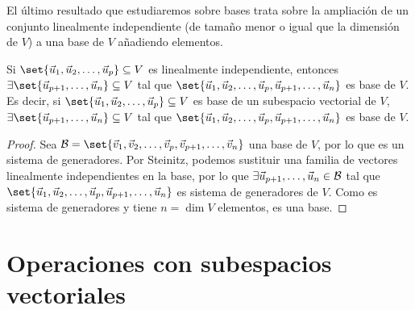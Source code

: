 \documentclass[../algebra_lineal.tex]{subfiles}
\begin{document}
El último resultado que estudiaremos sobre bases trata sobre la ampliación de un conjunto linealmente independiente (de tamaño menor o igual que la dimensión de $V$) a una base de $V$ añadiendo elementos.
\begin{theorem}   
    Si $\set{\vlst{u}{p}} \subseteq V$ es linealmente independiente, entonces  $\exists \set{\vu_{p+1}, \dots, \vu_n} \subseteq V$ tal que $\set{\vlst{u}{p}, \vu_{p+1}, \dots, \vu_n}$ es base de $V$. Es decir, si $\set{\vlst{u}{p}} \subseteq V$ es base de un subespacio vectorial de $V$, $\exists \set{\vu_{p+1}, \dots, \vu_n} \subseteq V$ tal que $\set{\vlst{u}{p}, \vu_{p+1}, \dots, \vu_n}$ es base de $V$.
\end{theorem}
\begin{proof}
    Sea $\mathcal{B} = \set{\vlst{v}{p}, \vv_{p+1}, \dots, \vv_{n}}$ una base de $V$, por lo que es un sistema de generadores. Por Steinitz, podemos sustituir una familia de vectores linealmente independientes en la base, por lo que $\exists \vec{u}_{p+1}, \dots, \vec{u}_n \in \mathcal{B}$ tal que  $\set{\vlst{u}{p}, \vu_{p+1}, \dots, \vu_n}$ es sistema de generadores de $V$. Como es sistema de generadores y tiene $n = \dim{V}$ elementos, es una base.
\end{proof}

\section{Operaciones con subespacios vectoriales}
\end{document}
